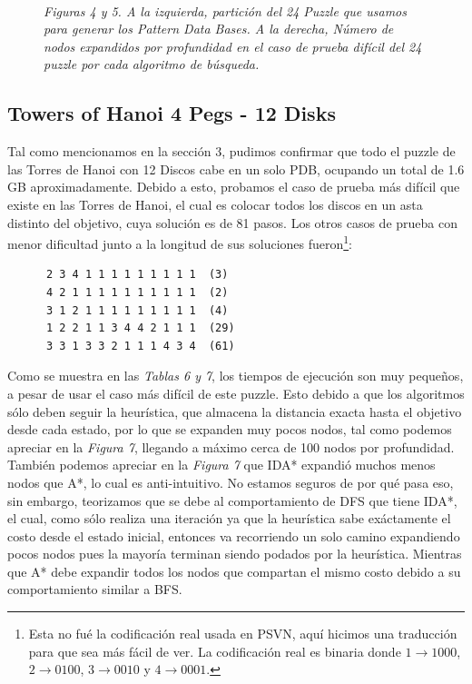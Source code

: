 \documentclass[a4paper,10pt]{article}
\begin{document}
\begin{figure}[t!]
      \\
      \small{\textit{Figuras 4 y 5. A la izquierda, partici\'on del 24 Puzzle
      que usamos para generar los Pattern Data Bases. A la derecha, N\'umero 
      de nodos expandidos por profundidad en el caso de prueba dif\'icil del 
      24 puzzle por cada algoritmo de b\'usqueda.}}
    \end{figure}

  \subsection{Towers of Hanoi 4 Pegs - 12 Disks}
    Tal como mencionamos en la secci\'on 3, pudimos confirmar que todo el puzzle de las
    Torres de Hanoi con 12 Discos cabe en un solo PDB, ocupando un total de 1.6 GB
    aproximadamente. Debido a esto, probamos el caso de prueba m\'as dif\'icil que 
    existe en las Torres de Hanoi, el cual es colocar todos los discos en un asta distinto 
    del objetivo, cuya soluci\'on es de 81 pasos. Los otros casos de prueba con menor
    dificultad junto a la longitud de sus soluciones fueron\footnote{Esta no
    fu\'e la codificaci\'on real usada en PSVN, aqu\'i hicimos una traducci\'on para que
    sea m\'as f\'acil de ver. La codificaci\'on real es binaria donde 
    $1 \rightarrow 1 0 0 0$, $2 \rightarrow 0 1 0 0$, $3 \rightarrow 0 0 1 0$ y 
    $4 \rightarrow 0 0 0 1$.}:
    
    \begin{verbatim}
      2 3 4 1 1 1 1 1 1 1 1 1  (3)
      4 2 1 1 1 1 1 1 1 1 1 1  (2)
      3 1 2 1 1 1 1 1 1 1 1 1  (4)
      1 2 2 1 1 3 4 4 2 1 1 1  (29)
      3 3 1 3 3 2 1 1 1 4 3 4  (61)
    \end{verbatim}
    
    Como se muestra en las \textit{Tablas 6 y 7}, los tiempos de ejecuci\'on son muy 
    peque\~nos, a pesar de usar el caso m\'as dif\'icil de este puzzle. Esto debido a 
    que los algoritmos s\'olo deben seguir la heur\'istica, que almacena la distancia 
    exacta hasta el objetivo desde cada estado, por lo que se expanden muy pocos nodos, 
    tal como podemos apreciar en la \textit{Figura 7}, llegando a m\'aximo cerca de 100 
    nodos por profundidad. \\
    
    Tambi\'en podemos apreciar en la \textit{Figura 7} que IDA* expandi\'o muchos menos 
    nodos que A*, lo cual es anti-intuitivo. No estamos seguros de por qu\'e pasa eso, sin
    embargo, teorizamos que se debe al comportamiento de DFS que tiene IDA*, el cual, como
    s\'olo realiza una iteraci\'on ya que la heur\'istica sabe ex\'actamente el costo desde
    el estado inicial, entonces va recorriendo un solo camino expandiendo pocos nodos pues
    la mayor\'ia terminan siendo podados por la heur\'istica. Mientras que A* debe expandir
    todos los nodos que compartan el mismo costo debido a su comportamiento similar a BFS.\\
    
\end{document}
